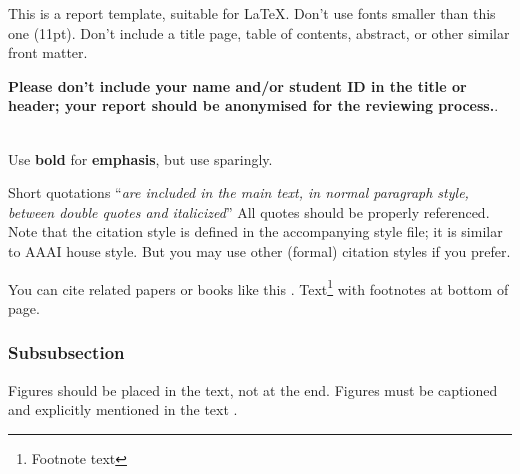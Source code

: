 \documentclass[11pt]{article}
\begin{document}
This is a report template, suitable for \LaTeX. Don't use fonts smaller than this one (11pt). Don't include a title page,
table of contents, abstract, or other similar front matter.

\textbf{Please don't include your name and/or student ID in the title or header; your report should be anonymised for the reviewing process.}.

\ \\ Use \textbf{bold} for \textbf{emphasis}, but use sparingly. 

Short quotations ``\textit{are included in the main text, in normal paragraph style, between double quotes and italicized}'' All quotes should be properly referenced. Note that the citation style is defined in the accompanying
style file; it is similar to AAAI house style. But you may use other (formal) citation styles if you prefer.

You can cite related papers or books like this \cite{bishop2006pattern}. Text\footnote{Footnote text} with footnotes at bottom of page.
\subsubsection{Subsubsection}

Figures should be placed in the text, not at the end. Figures must be captioned and explicitly mentioned in the text . 
\end{document}
